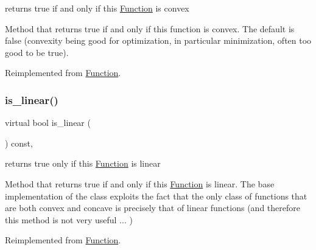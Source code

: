 returns true if and only if this \mbox{\hyperlink{class_s_m_spp__di__unipi__it_1_1_function}{Function}} is convex 

Method that returns true if and only if this function is convex. The default is false (convexity being good for optimization, in particular minimization, often too good to be true). 

Reimplemented from \mbox{\hyperlink{class_s_m_spp__di__unipi__it_1_1_function_a8eac4d4ff5bcf2e564138655ee01ece8}{Function}}.

\mbox{\label{class_s_m_spp__di__unipi__it_1_1_d_quad_function_a8afe6138b9ef7838ec5b851cbc3ad2fc}} 
\subsubsection{\texorpdfstring{is\+\_\+linear()}{is\_linear()}}
{\footnotesize\ttfamily virtual bool is\+\_\+linear (\begin{DoxyParamCaption}\item[{void}]{ }\end{DoxyParamCaption}) const\hspace{0.3cm}{\ttfamily [override]}, {\ttfamily [virtual]}}



returns true only if this \mbox{\hyperlink{class_s_m_spp__di__unipi__it_1_1_function}{Function}} is linear 

Method that returns true if and only if this \mbox{\hyperlink{class_s_m_spp__di__unipi__it_1_1_function}{Function}} is linear. The base implementation of the class exploits the fact that the only class of functions that are both convex and concave is precisely that of linear functions (and therefore this method is not very useful ... ) 

Reimplemented from \mbox{\hyperlink{class_s_m_spp__di__unipi__it_1_1_function_a76ad93a7b21d3deb7a917b3cd33d0a9d}{Function}}.

\mbox{\label{class_s_m_spp__di__unipi__it_1_1_d_quad_function_a4999c961244a6547170ef8f1c786cfa5}} 

